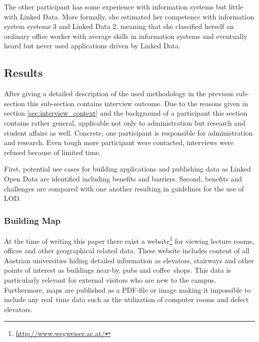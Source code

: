 \documentclass{article}
\begin{document}
The other participant has some experience with information systems but little with Linked Data. More formally, she estimated her competence with information system systems 3 and Linked Data 2, meaning that she classified herself an ordinary office worker with average skills in information systems and eventually heard but never used applications driven by Linked Data. 

\subsection{Results}
\label{sec:results}
After giving a detailed description of the used methodology in the previous sub-section this sub-section contains interview outcome.
Due to the reasons given in section \ref{sec:interview_context} and the background of a participant this section contains rather general, applicable not only to administration but research and student affairs as well. Concrete, one participant is responsible for administration and research. Even tough more participant were contacted, interviews were refused because of limited time.

First, potential use cases for building applications and publishing data as Linked Open Data are identified including benefits and barriers. Second, benefits and challenges are compared with one another resulting in guidelines for the use of LOD. 

\subsubsection{Building Map}
At the time of writing this paper there exist a website\footnote{\url{http://www.wegweiser.ac.at/}} for viewing lecture rooms, offices and other geographical related data. These website includes content of all Austrian universities hiding detailed information as elevators, stairways and other points of interest as buildings near-by, pubs and coffee~shops. 
This data is particularly relevant for external visitors who are new to the campus. Furthermore, maps are published as a PDF-file or image making it impossible to include any real~time data such as the utilization of computer rooms and defect elevators.
\end{document}
